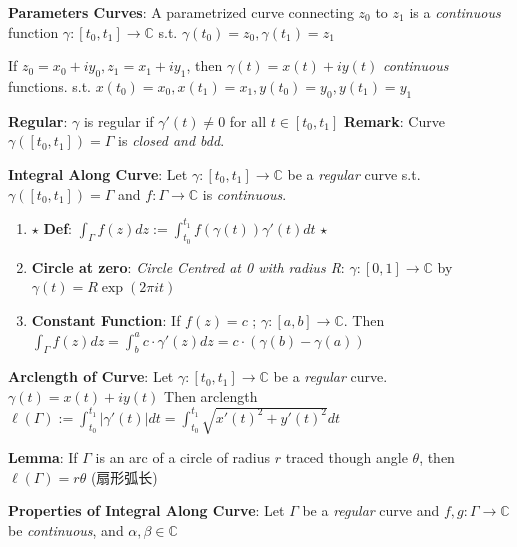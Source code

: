 \documentclass[9pt]{article}
\begin{document}
\textbf{Parameters Curves}: A parametrized curve connecting $z_0$ to $z_1$ is a \textit{continuous} function $\gamma:[t_0,t_1]\to\mathbb{C}$ s.t. $\gamma(t_0)=z_0,\gamma(t_1)=z_1$

\quad If {\footnotesize $z_0=x_0+iy_0,z_1=x_1+iy_1$, then $\gamma(t)=x(t)+iy(t)$ \textit{continuous} functions. s.t. $x(t_0)=x_0,x(t_1)=x_1,y(t_0)=y_0,y(t_1)=y_1$}

\quad \textbf{Regular}: $\gamma$ is regular if $\gamma'(t)\ne0$ for all $t\in[t_0,t_1]$ \qquad \textbf{Remark}: Curve $\gamma([t_0,t_1])=\Gamma$ is \textit{closed and bdd}.

\textbf{Integral Along Curve}: Let $\gamma:[t_0,t_1]\to\mathbb{C}$ be a \textit{regular} curve s.t. $\gamma([t_0,t_1])=\Gamma$ and $f:\Gamma\to\mathbb{C}$ is \textit{continuous}.

\begin{enumerate}[itemsep=-2pt, topsep=-2pt]
    \item $\star$ \textbf{Def}: $\int_{\Gamma}f(z)dz:=\int_{t_0}^{t_1}f(\gamma(t))\gamma'(t)dt$ $\star$
    \item \textbf{Circle at zero}: \textit{Circle Centred at 0 with radius R}: $\gamma:[0,1]\to\mathbb{C}$ by $\gamma(t)=R\exp(2\pi it)$
    \item \textbf{Constant Function}: If $f(z)=c$ ; $\gamma:[a,b]\to\mathbb{C}$. Then $\int_{\Gamma}f(z)dz=\int^a_b c\cdot\gamma'(z) dz = c\cdot(\gamma(b)-\gamma(a))$
\end{enumerate}

\textbf{Arclength of Curve}: {\small Let $\gamma:[t_0,t_1]\to\mathbb{C}$ be a \textit{regular} curve. $\gamma(t)=x(t)+iy(t)$ Then arclength $\ell(\Gamma):=\int_{t_0}^{t_1}|\gamma'(t)|dt=\int^{t_1}_{t_0}\sqrt{x'(t)^2+y'(t)^2}dt$}

\quad \textbf{Lemma}: If $\Gamma$ is an arc of a circle of radius $r$ traced though angle $\theta$, then $\ell(\Gamma)=r\theta$ {\small (扇形弧长)}

\textbf{Properties of Integral Along Curve}: Let $\Gamma$ be a \textit{regular} curve and $f,g:\Gamma\to\mathbb{C}$ be \textit{continuous}, and $\alpha,\beta\in\mathbb{C}$
\end{document}
